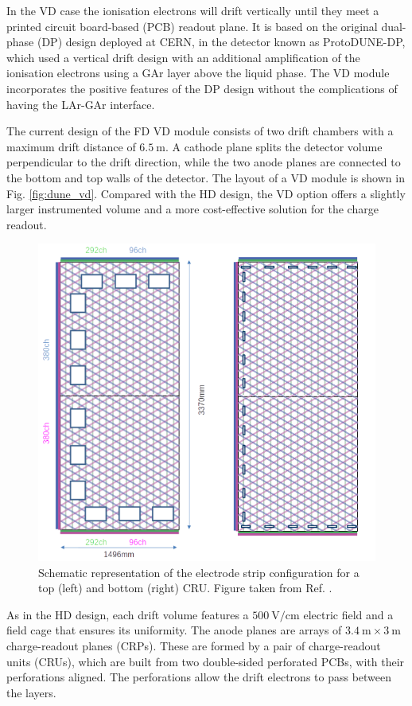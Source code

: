In the VD case the ionisation electrons will drift vertically until they meet a printed circuit board-based (PCB) readout plane. It is based on the original dual-phase (DP) design deployed at CERN, in the detector known as ProtoDUNE-DP, which used a vertical drift design with an additional amplification of the ionisation electrons using a GAr layer above the liquid phase. The VD module incorporates the positive features of the DP design without the complications of having the LAr-GAr interface.

The current design of the FD VD module consists of two drift chambers with a maximum drift distance of $6.5~\mathrm{m}$. A cathode plane splits the detector volume perpendicular to the drift direction, while the two anode planes are connected to the bottom and top walls of the detector. The layout of a VD module is shown in Fig. \ref{fig:dune_vd}. Compared with the HD design, the VD option offers a slightly larger instrumented volume and a more cost-effective solution for the charge readout.

\begin{figure}[t]
	\centering
	\includegraphics[width=0.70\linewidth]{Images/DUNE/FD/3V_anode_layout}
	\caption[Schematic representation of the electrode strip configuration for a top and bottom CRU.]{Schematic representation of the electrode strip configuration for a top (left) and bottom (right) CRU. Figure taken from Ref. \cite{DUNEVDTDR}.}
	\label{fig:dune_cru}
\end{figure}

As in the HD design, each drift volume features a $500~\mathrm{V/cm}$ electric field and a field cage that ensures its uniformity. The anode planes are arrays of $3.4~\mathrm{m}\times3~\mathrm{m}$ charge-readout planes (CRPs). These are formed by a pair of charge-readout units (CRUs), which are built from two double-sided perforated PCBs, with their perforations aligned. The perforations allow the drift electrons to pass between the layers.

